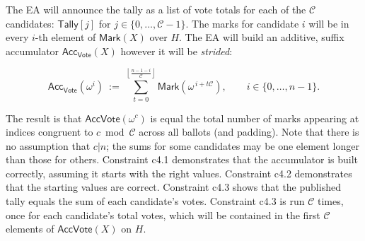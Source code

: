  The EA will announce the tally as a list of vote totals for each of the $\mathcal{C}$ candidates: $\mathsf{Tally}[j]$ for $j\in\{0,\ldots,\mathcal{C}-1\}$. The marks for candidate $i$ will be in every $i$-th element of $\mathsf{Mark}(X)$ over $H$. The EA will build an additive, suffix accumulator $\mathsf{Acc}_{\mathsf{Vote}}(X)$ however it will be \textit{strided}: 

$$
\mathsf{Acc}_{\mathsf{Vote}}(\omega^i)\ :=\ \sum_{t=0}^{\left\lfloor\frac{n-1-i}{\mathcal{C}}\right\rfloor}\mathsf{Mark}\!\left(\omega^{\,i+t\mathcal{C}}\right),
\qquad i\in\{0,\ldots,n-1\}.
$$

\noindent  The result is that $\mathsf{Acc}{\mathsf{Vote}}(\omega^c)$ is equal the total number of marks appearing at indices congruent to $c \bmod \mathcal{C}$ across all ballots (and padding). Note that there is no assumption that $c | n$; the sums for some candidates may be one element longer than those for others. Constraint c4.1 demonstrates that the accumulator is built correctly, assuming it starts with the right values. Constraint c4.2 demonstrates that the starting values are correct. Constraint c4.3 shows that the published tally equals the sum of each candidate's votes. Constraint c4.3 is run $\mathcal{C}$ times, once for each candidate's total votes, which will be contained in the first $\mathcal{C}$ elements of  $\mathsf{Acc}{\mathsf{Vote}}(X)$ on $H$.
 

